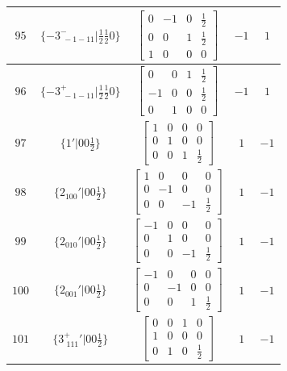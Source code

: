 \documentclass[fleqn,8pt]{jsarticle}
\begin{document}
\begin{longtable}{ccccc}
$ 95 $ & $ \{-3^{-}_{\,\,-1-11}|\frac{1}{2} \frac{1}{2} 0\} $ & $ \begin{bmatrix} 0 & -1 & 0 & \frac{1}{2} \\ 0 & 0 & 1 & \frac{1}{2} \\ 1 & 0 & 0 & 0 \end{bmatrix} $ & $ -1 $ & $ 1 $ \\ \hline
$ 96 $ & $ \{-3^{+}_{\,\,-1-11}|\frac{1}{2} \frac{1}{2} 0\} $ & $ \begin{bmatrix} 0 & 0 & 1 & \frac{1}{2} \\ -1 & 0 & 0 & \frac{1}{2} \\ 0 & 1 & 0 & 0 \end{bmatrix} $ & $ -1 $ & $ 1 $ \\ \hline
$ 97 $ & $ \{1{}'|0 0 \frac{1}{2}\} $ & $ \begin{bmatrix} 1 & 0 & 0 & 0 \\ 0 & 1 & 0 & 0 \\ 0 & 0 & 1 & \frac{1}{2} \end{bmatrix} $ & $ 1 $ & $ -1 $ \\ \hline
$ 98 $ & $ \{2{}_{100}{}'|0 0 \frac{1}{2}\} $ & $ \begin{bmatrix} 1 & 0 & 0 & 0 \\ 0 & -1 & 0 & 0 \\ 0 & 0 & -1 & \frac{1}{2} \end{bmatrix} $ & $ 1 $ & $ -1 $ \\ \hline
$ 99 $ & $ \{2{}_{010}{}'|0 0 \frac{1}{2}\} $ & $ \begin{bmatrix} -1 & 0 & 0 & 0 \\ 0 & 1 & 0 & 0 \\ 0 & 0 & -1 & \frac{1}{2} \end{bmatrix} $ & $ 1 $ & $ -1 $ \\ \hline
$ 100 $ & $ \{2{}_{001}{}'|0 0 \frac{1}{2}\} $ & $ \begin{bmatrix} -1 & 0 & 0 & 0 \\ 0 & -1 & 0 & 0 \\ 0 & 0 & 1 & \frac{1}{2} \end{bmatrix} $ & $ 1 $ & $ -1 $ \\ \hline
$ 101 $ & $ \{3^{+}_{\,\,111}{}'|0 0 \frac{1}{2}\} $ & $ \begin{bmatrix} 0 & 0 & 1 & 0 \\ 1 & 0 & 0 & 0 \\ 0 & 1 & 0 & \frac{1}{2} \end{bmatrix} $ & $ 1 $ & $ -1 $ \\ \hline

\end{longtable}
\end{document}
